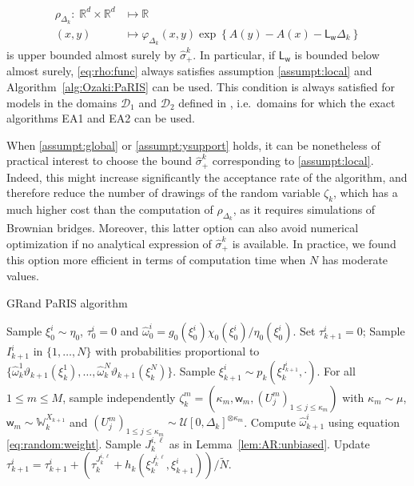 \documentclass[12pt]{article}
\newcommand{\eqsp}{\;}
\newcommand{\1}{\mathrm{1}}
\newcommand{\mw}{\mathsf{w}}%
\newcommand{\Lo}{\mathsf{L}}
\begin{document}
\begin{align}
\rho_{\Delta_k}:\eqsp\mathbb{R}^d\times \mathbb{R}^d &\mapsto \mathbb{R}\nonumber\\
(x,y)&\mapsto \varphi_{\Delta_k}(x,y) \exp \left\{A(y) - A(x)- \Lo_\mw\Delta_k \right\}\label{eq:rho:func}
\end{align}
is upper bounded almost surely by $\hat{\sigma}^k_+$.
In particular, if $\Lo_\mw$ is bounded below almost surely, \eqref{eq:rho:func} always satisfies assumption \eqref{assumpt:local} and Algorithm~\ref{alg:Ozaki:PaRIS} can be used. 
This condition is always satisfied for models in the domains $\mathcal{D}_1$ and $\mathcal{D}_2$ defined in \cite{beskos:papaspiliopoulos:roberts:fearnhead:2006}, i.e.\ domains for which the exact algorithms EA1 and EA2 can be used.

When \eqref{assumpt:global} or \eqref{assumpt:ysupport} holds, it can be nonetheless of practical interest to choose the bound $\hat{\sigma}^k_+$ corresponding to \eqref{assumpt:local}. 
Indeed, this might increase significantly the acceptance rate of the algorithm, and therefore reduce the number of drawings of the random variable $\zeta_k$, which has a much higher cost than the computation of $\rho_{\Delta_k}$, as it requires simulations of Brownian bridges. 
Moreover, this latter option can also avoid numerical optimization if no analytical expression of $\hat{\sigma}_+^k$ is available. 
In practice, we found this option more efficient in terms of computation time when $N$ has moderate values. 

\begin{algorithm}
\caption{GRand PaRIS algorithm}
\begin{algorithmic}
\STATE Sample $\xi_0^i \sim\eta_0$, $\tau_0^i = 0$  and  $\widehat \omega_0^i = g_0(\xi_0^i)\chi_0(\xi_0^i)/\eta_0(\xi_0^i)$.
\ENDFOR
{}
\STATE Set $\tau_{k+1}^i=0$;
\STATE Sample $I_{k+1}^{i}$ in $\{1,\ldots,N\}$ with probabilities proportional to $\{\widehat{\omega}_{k}^1\vartheta_{k+1}(\xi_{k}^1),\dots,\widehat{\omega}_{k}^N\vartheta_{k+1}(\xi_{k}^N)\}$.
\STATE Sample $\xi_{k+1}^{i} \sim p_k(\xi_{k}^{I_{k+1}^{i}},\cdot)$.
\STATE For all $1\le m\le M$, sample independently $\zeta_k^m=(\kappa_m,\mw_m, (U_j^m)_{1\leq j\leq \kappa_m})$ with $\kappa_m\sim \mu$, $\mw_m\sim \mathbb{W}_k^{X_{k+1}}$ and $(U_j^m)_{1\leq j\leq \kappa_m}\sim \mathcal{U}[0,\Delta_k]^{\otimes \kappa_m}$.
\STATE Compute $\widehat{\omega}^{i}_{k+1}$ using equation \eqref{eq:random:weight}.
\STATE Sample $J_k^{i,\ell}$ as in Lemma~\ref{lem:AR:unbiased}.
\STATE Update $\tau_{k+1}^i = \tau_{k+1}^i + (\tau^{J_k^{i,\ell}}_{k} + h_k(\xi^{J_k^{i,\ell}}_{k},\xi^i_{k+1}))/\tilde{N}$.
\ENDFOR
\ENDFOR
\ENDFOR
\end{algorithmic}
\label{alg:Ozaki:PaRIS}
\end{algorithm}
\end{document}
